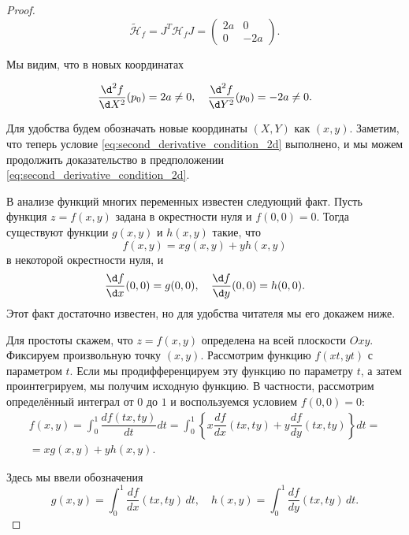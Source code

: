 \documentclass[a4paper,12pt,openany,leqno]{extbook}
\begin{document}
\begin{proof}
\begin{equation}
\widetilde{\mathcal{H}}_f = J^T \mathcal{H}_f J =
\left(
  \begin{array}{cc}
   2a & 0\\
   0 & -2a
  \end{array}
\right).
\end{equation}

Мы видим, что в новых координатах

\begin{equation}
\dfrac{\d^2 f}{\d X^2}(p_0) = 2a \neq 0,\quad \dfrac{\d^2 f}{\d Y^2}(p_0) = -2a \neq 0.
\end{equation}

Для удобства будем обозначать новые координаты $(X, Y)$ как $(x, y)$. Заметим, что теперь условие 
\ref{eq:second_derivative_condition_2d} выполнено, и мы можем продолжить доказательство в предположении \ref{eq:second_derivative_condition_2d}.

В анализе функций многих переменных известен следующий факт. Пусть функция $z = f(x, y)$ задана в окрестности нуля и $f(0, 0) = 0$. Тогда существуют функции $g(x, y)$ и $h(x, y)$ такие, что
\begin{equation}
f(x, y) = x g(x, y) + y h(x, y)
\label{eq:func_decomposition_2d}
\end{equation}
в некоторой окрестности нуля, и 
\begin{equation}
\dfrac{\d f}{\d x}(0, 0) = g(0, 0),\quad \dfrac{\d f}{\d y}(0, 0) = h(0, 0).
\label{eq:func_decomposition_2d_zero_condition}
\end{equation}
Этот факт достаточно известен, но для удобства читателя мы его докажем ниже.

Для простоты скажем, что $z = f(x, y)$ определена на всей плоскости $Oxy$. Фиксируем произвольную точку $(x, y)$. Рассмотрим функцию $f(xt, yt)$ с параметром $t$. Если мы продифференцируем эту функцию по параметру $t$, а затем проинтегрируем, мы получим исходную функцию. В частности, рассмотрим определённый интеграл от $0$ до $1$ и воспользуемся условием $f(0, 0) = 0$:
\begin{multline}
f(x, y) = \int_0^1 \dfrac{df(tx, ty)}{dt} dt = \int_0^1 \left\{x\dfrac{df}{dx}(tx, ty) + y\dfrac{df}{dy}(tx, ty)\right\} dt =\\= x g(x, y) + y h(x, y).
\end{multline}


Здесь мы ввели обозначения
\begin{equation}
g(x, y) = \int_0^1 \dfrac{df}{dx}(tx, ty)\,dt,\quad h(x, y) = \int_0^1 \dfrac{df}{dy}(tx, ty)\,dt.
\label{eq:morse_lemma_fg_2d}
\end{equation}


\end{proof}
\end{document}
